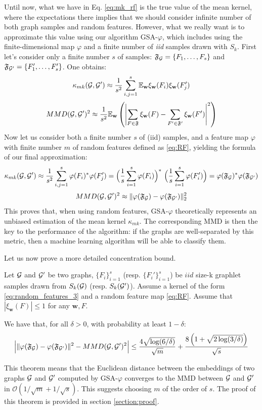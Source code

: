 Until now, what we have in Eq. \ref{eq:mk_rf} is the true value of the mean kernel, where the expectations there implies that we should consider infinite number of both graph samples and random features. However, what we really want is to approximate this value using our algorithm GSA-$\varphi$, which includes  using the finite-dimensional map $\varphi$ and a finite number of \emph{iid} samples drawn with $S_k$. First let's consider only a finite number $s$ of samples: $\mathfrak{F}_{\mathcal{G}}=\{F_1, \ldots, F_s\}$ and $\mathfrak{F}_{\mathcal{G}'}=\{F'_1, \ldots, F'_s\}$. One obtains: 
\begin{equation}
\label{eq:MK_samples}
\kappa_{mk}(\mathcal{G},\mathcal{G}') \approx \frac{1}{s^2} \sum_{i,j=1}^s \mathbb{E}_\mathbf{w} \xi_\mathbf{w}(F_i)\xi_\mathbf{w}(F'_j)
\end{equation}
\[
MMD(\mathcal{G},\mathcal{G}')^2 \approx \frac{1}{s^2}\mathbb{E}_\mathbf{w} \left( \left|\sum_{F\in\mathfrak{F}} \xi_\mathbf{w}(F) - \sum_{F'\in\mathfrak{F}'} \xi_\mathbf{w}(F') \right|^2 \right)
\]
Now let us consider both a finite number $s$ of (iid) samples, and a feature map $\varphi$ with finite number $m$ of random features defined as \eqref{eq:RF}, yielding the formula of our final approximation:
\begin{equation}
\label{eq:mean_kernel_RF}
\kappa_{mk}(\mathcal{G},\mathcal{G}') \approx \frac{1}{s^2} \sum_{i,j=1}^s \varphi(F_i)^*\varphi(F_j')=\Big(\frac{1}{s}\sum_{i=1}^s\varphi(F_i)\Big)^*~\Big(\frac{1}{s}\sum_{i=1}^s\varphi(F_i')\Big) = {\varphi}(\mathfrak{F}_{\mathcal{G}})^* {\varphi}(\mathfrak{F}_{\mathcal{G}'})
\end{equation}
\[
MMD(\mathcal{G},\mathcal{G}')^2 \approx  \| {\varphi}(\mathfrak{F}_{\mathcal{G}}) - {\varphi}(\mathfrak{F}_{\mathcal{G}'}) \|_2^2 
\]
This proves that, when using random features, GSA-$\varphi$ theoretically represents an unbiased estimation of the mean kernel $\kappa_{mk}$. The corresponding MMD is then the key to the performance of the algorithm: if the graphs are well-separated by this metric, then a machine learning algorithm will be able to classify them.

Let us now prove a more detailed concentration bound.
\begin{theorem}
\label{theorem:concentration}
Let $\mathcal{G}$ and $\mathcal{G}'$ be two graphs, $\{F_i\}_{i=1}^{s}$ (resp. $\{F_i'\}_{i=1}^{s}$) be $iid$ size-k graphlet samples drawn from $S_k(\mathcal{G})$ (resp. $S_k(\mathcal{G}')$). Assume a kernel of the form \eqref{eq:random_features_3} and a random feature map \eqref{eq:RF}. Assume that $|\xi_\mathbf{w}(F)| \leq 1$ for any $\mathbf{w},F$.

We have that, for all $\delta>0$, with probability at least $1-\delta$:
\begin{align*}
 \Big|\|\varphi(\mathfrak{F}_{\mathcal{G}}) - \varphi(\mathfrak{F}_{\mathcal{G}'})\|^2 - MMD(\mathcal{G},\mathcal{G}')^2 \Big| \leq \frac{4 \sqrt{\log (6/\delta)}}{\sqrt{m}} + \frac{8\left(1+\sqrt{2\log(3/\delta)}\right)}{\sqrt{{s}}}
\end{align*}
\end{theorem}
This theorem means that the Euclidean distance between the embeddings of two graphs $\mathcal{G}$ and $\mathcal{G}'$ computed by GSA-$\varphi$ converges to the MMD between $\mathcal{G}$ and $\mathcal{G}'$ in $\mathcal{O}(1/\sqrt{m} + 1/\sqrt{s})$. This suggests choosing $m$ of the order of $s$. The proof of this theorem is provided in section \ref{section:proof}.

